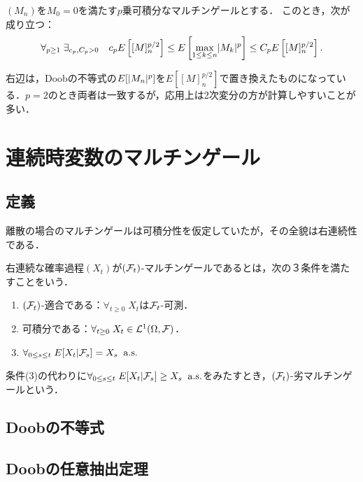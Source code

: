 \documentclass[uplatex,dvipdfmx]{jsreport}
\begin{document}
\begin{theorem}
    $(M_n)$を$M_0=0$を満たす$p$乗可積分なマルチンゲールとする．
    このとき，次が成り立つ：
    \[\forall_{p\ge 1}\;\exists_{c_p,C_p>0}\quad c_pE\left[[M]^{p/2}_n\right]\le E\left[\max_{1\le k\le n}\lvert M_k\rvert^p\right]\le C_pE\left[[M]^{p/2}_n\right].\]
\end{theorem}
\begin{remarks}
    右辺は，Doobの不等式の$E[\lvert M_n\rvert^p]$を$E[[M]_n^{p/2}]$で置き換えたものになっている．$p=2$のとき両者は一致するが，応用上は2次変分の方が計算しやすいことが多い．
\end{remarks}

\section{連続時変数のマルチンゲール}

\subsection{定義}

\begin{tcolorbox}[colframe=ForestGreen, colback=ForestGreen!10!white,breakable,colbacktitle=ForestGreen!40!white,coltitle=black,fonttitle=\bfseries\sffamily,
title=]
    離散の場合のマルチンゲールは可積分性を仮定していたが，その全貌は右連続性である．
\end{tcolorbox}

\begin{definition}
    右連続な確率過程$(X_t)$が$(\mathcal{F}_t)$-マルチンゲールであるとは，次の３条件を満たすことをいう．
    \begin{enumerate}
        \item $(\mathcal{F}_t)$-適合である：$\forall_{t\ge0}\;X_t$は$\mathcal{F}_t$-可測．
        \item 可積分である：$\forall_{t\ge0}\;X_t\in\mathcal{L}^1(\Omega,\mathcal{F})$．
        \item $\forall_{0\le s\le t}\;E[X_t|\mathcal{F}_s]=X_s\;\;\mathrm{a.s.}$
    \end{enumerate}
    条件(3)の代わりに$\forall_{0\le s\le t}\;E[X_t|\mathcal{F}_s]\ge X_s\;\;\mathrm{a.s.}$をみたすとき，$(\mathcal{F}_t)$-劣マルチンゲールという．
\end{definition}

\subsection{Doobの不等式}

\subsection{Doobの任意抽出定理}
\end{document}
